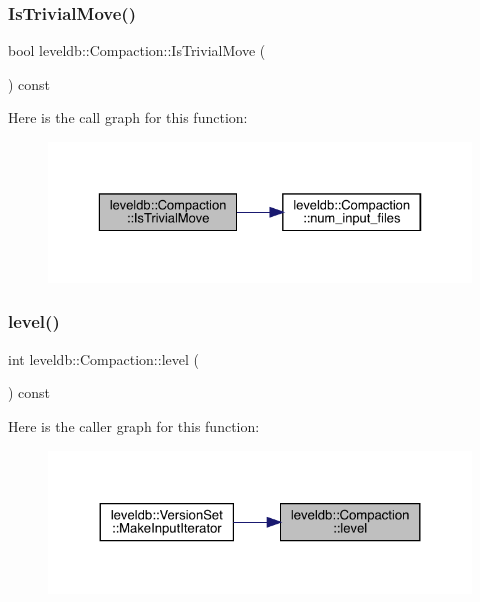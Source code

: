 \subsubsection{\texorpdfstring{IsTrivialMove()}{IsTrivialMove()}}
{\footnotesize\ttfamily bool leveldb\+::\+Compaction\+::\+Is\+Trivial\+Move (\begin{DoxyParamCaption}{ }\end{DoxyParamCaption}) const}

Here is the call graph for this function\+:
\nopagebreak
\begin{figure}[H]
\begin{center}
\leavevmode
\includegraphics[width=329pt]{classleveldb_1_1_compaction_a85ab53d400d49d1dfb7e8f63017fef99_cgraph}
\end{center}
\end{figure}
\mbox{\label{classleveldb_1_1_compaction_a716f0b644cf403944db14e7622519bd3}} 
\subsubsection{\texorpdfstring{level()}{level()}}
{\footnotesize\ttfamily int leveldb\+::\+Compaction\+::level (\begin{DoxyParamCaption}{ }\end{DoxyParamCaption}) const\hspace{0.3cm}{\ttfamily [inline]}}

Here is the caller graph for this function\+:
\nopagebreak
\begin{figure}[H]
\begin{center}
\leavevmode
\includegraphics[width=324pt]{classleveldb_1_1_compaction_a716f0b644cf403944db14e7622519bd3_icgraph}
\end{center}
\end{figure}
\mbox{\label{classleveldb_1_1_compaction_ad4487eda793d622dbcf0483663fef2ed}} 
